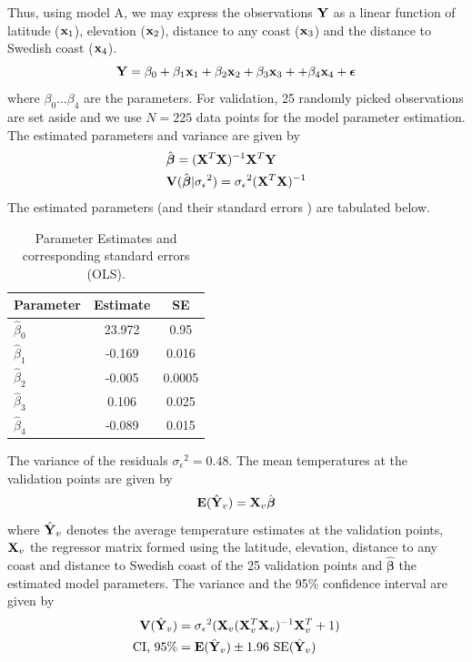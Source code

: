 \documentclass[a4paper,10pt]{article}
\def\bY{{\bf Y}}
\def\bX{{\bf X}}
\def\bE{{\bf E}}
\def\bV{{\bf V}}
\def\bx{{\bf x}}
\def\bbeta{{\boldsymbol \beta}}
\def\sigmaeps{{\sigma_{\epsilon}}}
\begin{document}
Thus, using model A, we may express the observations $\bY$ as a linear function of latitude ($\bx_1$), elevation ($\bx_2$), distance to any coast ($\bx_3$) and the distance to Swedish coast ($\bx_4$).
\begin{equation}
 \bY = \beta_0 + \beta_1 \bx_1 + \beta_2 \bx_2 + \beta_3 \bx_3 + + \beta_4 \bx_4 + {\boldsymbol \epsilon}
\end{equation}
where $\beta_0 \dots \beta_4$ are the parameters. For  validation, 25 randomly picked observations are set aside and we use $N = 225$ data points for the model parameter estimation. The estimated parameters and variance are given by
\begin{align*}
& \hat \bbeta = (\bX^T \bX)^{-1} \bX^T \bY\\
& \bV(\hat \bbeta | \sigmaeps^2) = \sigmaeps^2 (\bX^T \bX)^{-1}
\end{align*}
 The estimated parameters (and their standard errors ) are tabulated below.
\begin{table}[H]
\centering
\begin{tabular}{lcc}
\hline
{\bf Parameter} & {\bf Estimate} & {\bf SE }\\
\hline
$\hat \beta_0$ & 23.972 & 0.95 \\
$\hat \beta_1$ & -0.169 & 0.016\\
$\hat \beta_2$ & -0.005 & 0.0005 \\
$\hat \beta_3$ & 0.106 & 0.025\\
$\hat \beta_4$ & -0.089 & 0.015\\
\hline
\end{tabular}
\caption{Parameter Estimates and corresponding standard errors (OLS).}
\label{tab:olsest}
\end{table}
The variance of the residuals $\sigmaeps^2 = 0.48$. The mean temperatures at the validation points are given by
\begin{equation}
\bE(\hat \bY_v) = \bX_v \hat \bbeta
\end{equation}
where $\hat \bY_v$ denotes the average temperature estimates at the validation points, $\bX_v$  the regressor matrix formed using the latitude, elevation, distance to any coast and distance to Swedish coast of the 25 validation points and $\hat \bbeta$ the estimated model parameters. The variance and the 95\% confidence interval are given by
\begin{align*}
\bV(\hat \bY_v) &= \sigmaeps^2 (\bX_v (\bX_v^T\bX_v)^{-1} \bX_v^T + 1) \\
\text{CI, 95\%} &= \bE(\hat \bY_v) \pm 1.96 \text{ SE}(\hat \bY_v)
\end{align*}
\end{document}
